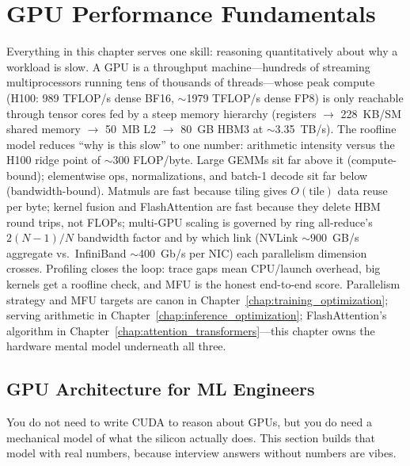 \chapter{GPU Performance Fundamentals}
\label{chap:gpu_fundamentals}

\begin{tldr}
Everything in this chapter serves one skill: reasoning quantitatively about why a workload is slow. A GPU is a throughput machine---hundreds of streaming multiprocessors running tens of thousands of threads---whose peak compute (H100: 989 TFLOP/s dense BF16, $\sim$1979 TFLOP/s dense FP8) is only reachable through tensor cores fed by a steep memory hierarchy (registers $\to$ 228~KB/SM shared memory $\to$ 50~MB L2 $\to$ 80~GB HBM3 at $\sim$3.35~TB/s). The roofline model reduces ``why is this slow'' to one number: arithmetic intensity versus the H100 ridge point of $\sim$300 FLOP/byte. Large GEMMs sit far above it (compute-bound); elementwise ops, normalizations, and batch-1 decode sit far below (bandwidth-bound). Matmuls are fast because tiling gives $O(\text{tile})$ data reuse per byte; kernel fusion and FlashAttention are fast because they delete HBM round trips, not FLOPs; multi-GPU scaling is governed by ring all-reduce's $2(N-1)/N$ bandwidth factor and by which link (NVLink $\sim$900~GB/s aggregate vs.\ InfiniBand $\sim$400~Gb/s per NIC) each parallelism dimension crosses. Profiling closes the loop: trace gaps mean CPU/launch overhead, big kernels get a roofline check, and MFU is the honest end-to-end score. Parallelism strategy and MFU targets are canon in Chapter~\ref{chap:training_optimization}; serving arithmetic in Chapter~\ref{chap:inference_optimization}; FlashAttention's algorithm in Chapter~\ref{chap:attention_transformers}---this chapter owns the hardware mental model underneath all three.
\end{tldr}

\section{GPU Architecture for ML Engineers}
\label{sec:gpu_arch}

You do not need to write CUDA to reason about GPUs, but you do need a mechanical model of what the silicon actually does. This section builds that model with real numbers, because interview answers without numbers are vibes.

